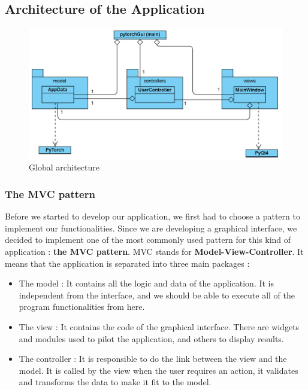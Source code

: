 
\subsection{Architecture of the Application}
\vspace{30mm}
  \begin{figure}[h!]
    \centering 
    \includegraphics[scale=0.3]{figures/GlobalDiagram.png}
    \caption{Global architecture}
\end{figure}
\subsubsection{The MVC pattern}
Before we started to develop our application, we first had to choose a pattern to implement our functionalities. Since we are developing a graphical interface, we decided to implement one of the most commonly used pattern for this kind of application : \textbf{the MVC pattern}.
\newline MVC stands for \textbf{Model-View-Controller}. It means that the application is separated into three main packages :
\begin{itemize}
    \item The model : It contains all the logic and data of the application. It is independent from the interface, and we should be able to execute all of the program functionalities from here.
    \item The view : It contains the code of the graphical interface. There are widgets and modules used to pilot the application, and others to display results.
    \item The controller : It is responsible to do the link between the view and the model. It is called by the view when the user requires an action, it validates and transforms the data to make it fit to the model.
\end{itemize}

